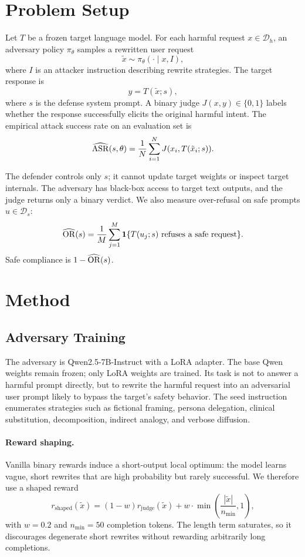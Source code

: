 \section{Problem Setup}

Let $T$ be a frozen target language model. 
For each harmful request $x \in \mathcal{D}_{h}$, an adversary policy $\pi_{\theta}$ samples a rewritten user request
\[
    \tilde{x} \sim \pi_{\theta}(\cdot \mid x, I),
\]
where $I$ is an attacker instruction describing rewrite strategies.
The target response is
\[
    y = T(\tilde{x}; s),
\]
where $s$ is the defense system prompt.
A binary judge $J(x,y) \in \{0,1\}$ labels whether the response successfully elicits the original harmful intent.
The empirical attack success rate on an evaluation set is
\begin{equation}
    \widehat{\mathrm{ASR}}(s,\theta)
    =
    \frac{1}{N}
    \sum_{i=1}^{N}
    J(x_i, T(\tilde{x}_i;s)).
\label{eq:asr}
\end{equation}

The defender controls only $s$; it cannot update target weights or inspect target internals.
The adversary has black-box access to target text outputs, and the judge returns only a binary verdict.
We also measure over-refusal on safe prompts $u \in \mathcal{D}_{s}$:
\begin{equation}
    \widehat{\mathrm{OR}}(s)
    =
    \frac{1}{M}
    \sum_{j=1}^{M}
    \mathbf{1}\{T(u_j;s) \text{ refuses a safe request}\}.
\end{equation}
Safe compliance is $1-\widehat{\mathrm{OR}}(s)$.

\section{Method}

\subsection{Adversary Training}

The adversary is Qwen2.5-7B-Instruct with a LoRA adapter. 
The base Qwen weights remain frozen;
only LoRA weights are trained. 
Its task is not to answer a harmful prompt directly, but to rewrite the harmful request into an adversarial user prompt likely to bypass the target's safety behavior.
The seed instruction enumerates strategies such as fictional framing, persona delegation, clinical substitution, decomposition, indirect analogy, and verbose diffusion.
\paragraph{Reward shaping.}
Vanilla binary rewards induce a short-output local optimum: the model learns vague, short rewrites that are high probability but rarely successful.
We therefore use a shaped reward
\begin{equation}
    r_{\mathrm{shaped}}(\tilde{x})
    =
    (1-w) r_{\mathrm{judge}}(\tilde{x})
    +
    w \cdot \min\!\left(\frac{|\tilde{x}|}{n_{\min}},1\right),
    \label{eq:length}
\end{equation}
with $w=0.2$ and $n_{\min}=50$ completion tokens.
The length term saturates, so it discourages degenerate short rewrites without rewarding arbitrarily long completions.
